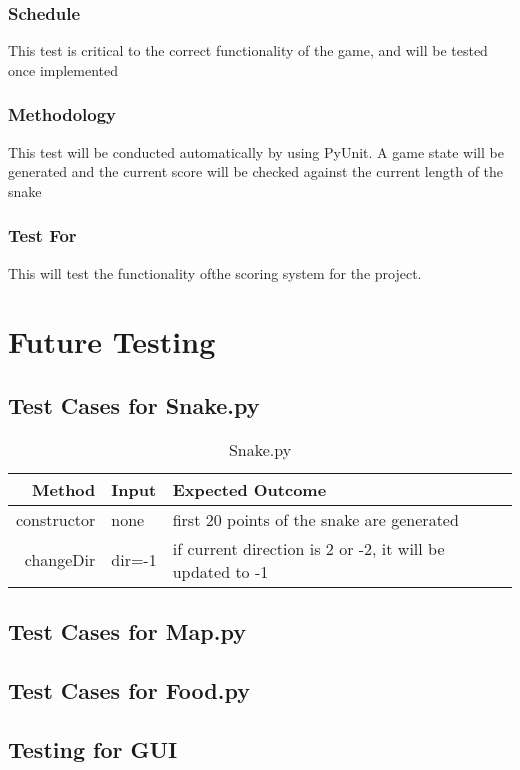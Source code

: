 \documentclass[12pt]{article}
\begin{document}
\subsubsection*{Schedule}
This test is critical to the correct functionality of the game, and will be tested once implemented
\subsubsection*{Methodology}
This test will be conducted automatically by using PyUnit. A game state will be generated and the current score will be checked against the current length of the snake
\subsubsection*{Test For}
This will test the functionality ofthe scoring system for the project. \newline


\section{Future Testing}
\subsection{Test Cases for Snake.py}

\begin{center}
	\begin{longtable}{ | r | p{4cm} | p{4cm} | p{4cm} |}
	\caption{Snake.py} \\ \hline \label{TblInputVar} 
	Method & Input & Expected Outcome\\ \hline
	constructor & none &  first 20 points of the snake are generated\\ \hline
	changeDir & dir=-1 & if current direction is 2 or -2, it will be updated to -1\\ \hline
	\end{longtable}
\end{center}




\subsection{Test Cases for Map.py}
\subsection{Test Cases for Food.py}
\subsection{Testing for GUI}




\end{document}
